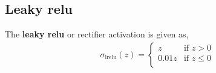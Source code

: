 \begin{appendices}
\subsection{Leaky relu}
The \textbf{leaky relu} or rectifier activation is given as,
\begin{align}
    \sigma_\mathrm{lrelu}(z) = 
    \begin{cases}
        z & \text{if } z > 0 \\
        0.01z & \text{if } z \leq 0 \\
    \end{cases}
    \label{eq:act-leaky-relu}
\end{align}


\end{appendices}